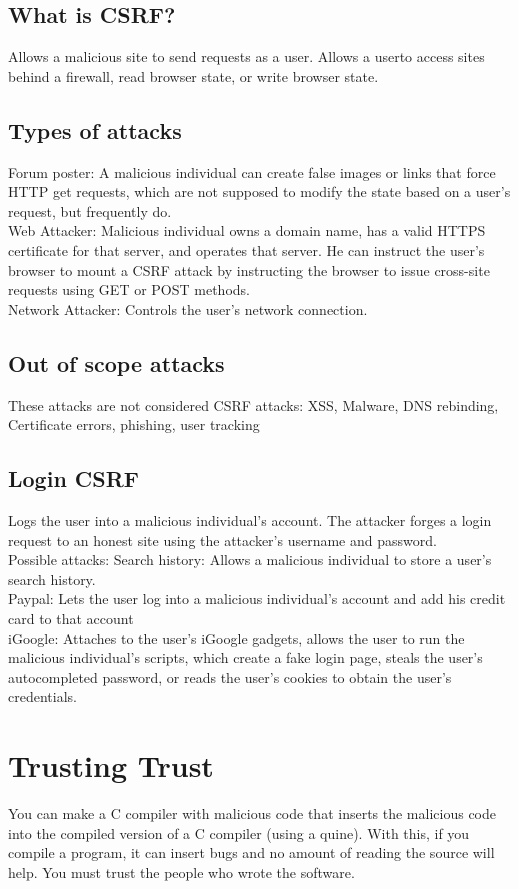 \subsection{What is CSRF?}
Allows a malicious site to send requests as a user. Allows a userto access sites behind a firewall, read browser state, or write browser state.
\subsection{Types of attacks}
Forum poster: A malicious individual can create false images or links that force HTTP get requests, which are not supposed to modify the state based on a user's request, but frequently do.\\
Web Attacker: Malicious individual owns a domain name, has a valid HTTPS certificate for that server, and operates that server. He can instruct the user's browser to mount a CSRF attack by instructing the browser to issue cross-site requests using GET or POST methods.\\
Network Attacker: Controls the user's network connection.
\subsection{Out of scope attacks}
These attacks are not considered CSRF attacks: XSS, Malware, DNS rebinding, Certificate errors, phishing, user tracking
\subsection{Login CSRF}
Logs the user into a malicious individual's account. The attacker forges a login request to an honest site using the attacker's username and password. \\
Possible attacks: Search history: Allows a malicious individual to store a user's search history.\\
Paypal: Lets the user log into a malicious individual's account and add his credit card to that account\\
iGoogle: Attaches to the user's iGoogle gadgets, allows the user to run the malicious individual's scripts, which create a fake login page, steals the user's autocompleted password, or reads the user's cookies to obtain the user's credentials.

\section{Trusting Trust}
You can make a C compiler with malicious code that inserts the malicious code into the compiled version of a C compiler (using a quine). With this, if you compile a program, it can insert bugs and no amount of reading the source will help. You must trust the people who wrote the software.

